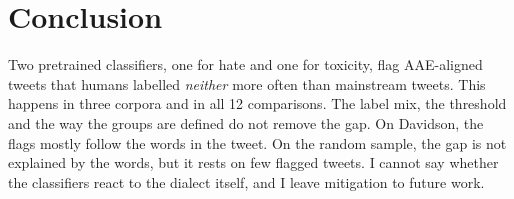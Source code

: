 \documentclass[runningheads,a4paper,oribibl]{llncs}
\begin{document}
\section{Conclusion}
Two pretrained classifiers, one for hate and one for toxicity, flag AAE-aligned tweets that
humans labelled \emph{neither} more often than mainstream tweets. This happens in three corpora
and in all 12 comparisons. The label mix, the threshold and the way the groups are defined do
not remove the gap. On Davidson, the flags mostly follow the words in the tweet. On the random
sample, the gap is not explained by the words, but it rests on few flagged tweets. I cannot say
whether the classifiers react to the dialect itself, and I leave mitigation to future work.



\end{document}

